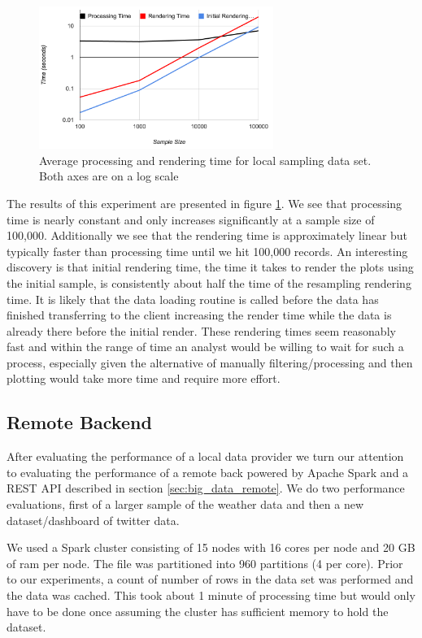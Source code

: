 \documentclass[letter,twocolumn]{article}
\begin{document}
\begin{figure}
\begin{center}
\includegraphics[width=3in]{figs/weather_perf.png}
\end{center}
\caption{Average processing and rendering time for local sampling data set.  Both axes are on a log scale}\label{fig:weather_perf}
\end{figure}

The results of this experiment are presented in figure \ref{fig:weather_perf}.
We see that processing time is nearly constant and only increases significantly at a sample size of 100,000.
Additionally we see that the rendering time is approximately linear but typically faster than processing time until we hit 100,000 records.
An interesting discovery is that initial rendering time, the time it takes to render the plots using the initial sample, is consistently about half the time of the resampling rendering time.
It is likely that the data loading routine is called before the data has finished transferring to the client increasing the render time while the data is already there before the initial render.
These rendering times seem reasonably fast and within the range of time an analyst would be willing to wait for such a process, especially given the alternative of manually filtering/processing and then plotting would take more time and require more effort.

\subsection{Remote Backend}

After evaluating the performance of a local data provider we turn our attention to evaluating the performance of a remote back powered by Apache Spark and a REST API described in section \ref{sec:big_data_remote}.  
We do two performance evaluations, first of a larger sample of the weather data and then a new dataset/dashboard of twitter data.

We used a Spark cluster consisting of 15 nodes with 16 cores per node and 20 GB of ram per node.
The file was partitioned into 960 partitions (4 per core).
Prior to our experiments, a count of number of rows in the data set was performed and the data was cached.
This took about 1 minute of processing time but would only have to be done once assuming the cluster has sufficient memory to hold the dataset.
\end{document}
